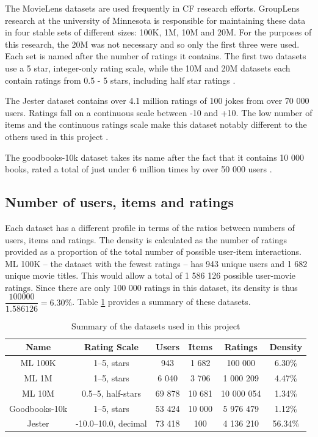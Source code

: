 The MovieLens datasets are used frequently in CF research efforts. GroupLens research at the university of Minnesota is responsible for maintaining these data in four stable sets of different sizes: 100K, 1M, 10M and 20M. For the purposes of this research, the 20M was not necessary and so only the first three were used. Each set is named after the number of ratings it contains. The first two datasets use a 5 star, integer-only rating scale, while the 10M and 20M datasets each contain ratings from 0.5 - 5 stars, including half star ratings \parencite{harper2016movielens}.

The Jester dataset contains over 4.1 million ratings of 100 jokes from over 70 000 users. Ratings fall on a continuous scale between -10 and +10. The low number of items and the continuous ratings scale make this dataset notably different to the others used in this project \parencite{cf_1.2_eigentaste}.

The goodbooks-10k dataset takes its name after the fact that it contains 10 000 books, rated a total of just under 6 million times by over 50 000 users \parencite{goodbooks2017}.

\subsection{Number of users, items and ratings}
Each dataset has a different profile in terms of the ratios between numbers of users, items and ratings. The density is calculated as the number of ratings provided as a proportion of the total number of possible user-item interactions. ML 100K -- the dataset with the fewest ratings -- has 943 unique users and 1 682 unique movie titles. This would allow a total of 1 586 126 possible user-movie ratings. Since there are only 100 000 ratings in this dataset, its density is thus $\dfrac{100000}{1.586126} = 6.30\%$. Table \ref{tab:data-summary} provides a summary of these datasets. 

\begin{table}[H]
\label{tab:data-summary}
\centering
\begin{tabular}{c | c | c | c | c | c}
\toprule
\textbf{Name} & \textbf{Rating Scale} & \textbf{Users} & \textbf{Items} & \textbf{Ratings} & \textbf{Density} \\
\midrule
ML 100K & 1--5, stars & 943 & 1 682 & 100 000 & 6.30\% \\
ML 1M & 1--5, stars & 6 040 & 3 706 & 1 000 209 & 4.47\% \\
ML 10M & 0.5--5, half-stars & 69 878 & 10 681 & 10 000 054 & 1.34\% \\
Goodbooks-10k & 1--5, stars & 53 424 & 10 000 & 5 976 479 & 1.12\% \\
Jester & -10.0--10.0, decimal & 73 418 & 100 & 4 136 210 & 56.34\% \\
\bottomrule
\end{tabular}
\caption[Data summary]{Summary of the datasets used in this project}
\end{table}

